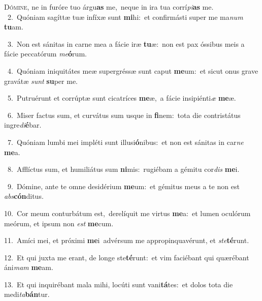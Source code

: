 \lettrine{\initial\textcolor{\initialcolor}{D}}{ómine,} ne in furóre tuo árgu\textbf{as} me,~\star neque in ira tua corrí\-\textit{pi}\-\textbf{as} me.\\
{\numbfont\textcolor{\numbcolor}{~2.}}~Quóniam sagíttæ tuæ infíxæ sunt \textbf{mi}\-hi:~\star et confirmásti super me ma\textit{num} \textbf{tu}\-am.\par
{\numbfont\textcolor{\numbcolor}{~3.}}~Non est sánitas in carne mea a fácie iræ \textbf{tu}\-æ:~\star non est pax óssibus meis a fácie peccatórum \textit{me}\-\textbf{ó}rum.\par
{\numbfont\textcolor{\numbcolor}{~4.}}~Quóniam iniquitátes meæ supergréssæ sunt caput \textbf{me}\-um:~\star et sicut onus grave gravátæ \textit{sunt} \textbf{su}\-per me.\par
{\numbfont\textcolor{\numbcolor}{~5.}}~Putruérunt et corrúptæ sunt cicatríces \textbf{me}\-æ,~\star a fácie insipiénti\textit{æ} \textbf{me}\-æ.\par
{\numbfont\textcolor{\numbcolor}{~6.}}~Miser factus sum, et curvátus sum usque in \textbf{fi}\-nem:~\star tota die contristátus ingre\-\textit{di}\-\textbf{é}bar.\par
{\numbfont\textcolor{\numbcolor}{~7.}}~Quóniam lumbi mei impléti sunt illusi\-\textbf{ó}\-nibus:~\star et non est sánitas in car\textit{ne} \textbf{me}\-a.\par
{\numbfont\textcolor{\numbcolor}{~8.}}~Afflíctus sum, et humiliátus sum \textbf{ni}\-mis:~\star rugiébam a gémitu cor\textit{dis} \textbf{me}\-i.\par
{\numbfont\textcolor{\numbcolor}{~9.}}~Dómine, ante te omne desidérium \textbf{me}\-um:~\star et gémitus meus a te non est \textit{abs}\-\textbf{cón}ditus.\par
{\numbfont\textcolor{\numbcolor}{10.}}~Cor meum conturbátum est,~\dagger derelíquit me virtus \textbf{me}\-a:~\star et lumen oculórum meórum, et ipsum non \textit{est} \textbf{me}\-cum.\par
{\numbfont\textcolor{\numbcolor}{11.}}~Amíci mei, et próximi \textbf{me}\-i~\star advérsum me appropinquavérunt, et \textit{ste}\-\textbf{té}runt.\par
{\numbfont\textcolor{\numbcolor}{12.}}~Et qui juxta me erant, de longe ste\-\textbf{té}\-runt:~\star et vim faciébant qui quærébant áni\textit{mam} \textbf{me}\-am.\par
{\numbfont\textcolor{\numbcolor}{13.}}~Et qui inquirébant mala mihi, locúti sunt vani\-\textbf{tá}\-tes:~\star et dolos tota die medi\-\textit{ta}\-\textbf{bán}tur.\par
